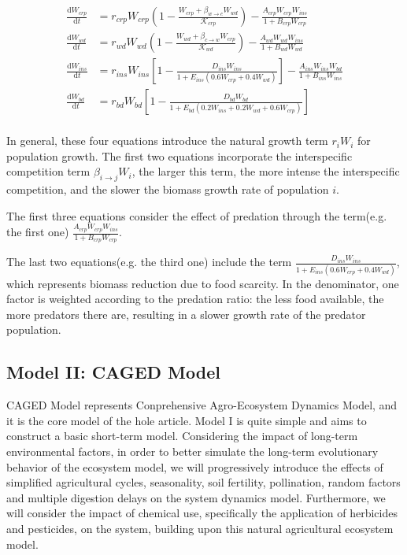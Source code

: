 \documentclass{HZNUMCM}
\begin{document}
      \begin{equation}
        \begin{aligned}
          \frac{\mathrm{d}W_{crp}}{\mathrm{d}t}&=r_{crp}W_{crp}\left( 1-\frac{W_{crp}+\beta _{w\rightarrow c}W_{wd}}{\mathscr{K} _{crp}} \right) -\frac{A_{crp}W_{crp}W_{ins}}{1+B_{crp}W_{crp}}\\
          \frac{\mathrm{d}W_{wd}}{\mathrm{d}t}&=r_{wd}W_{wd}\left( 1-\frac{W_{wd}+\beta _{c\rightarrow w}W_{crp}}{\mathscr{K} _{wd}} \right) -\frac{A_{wd}W_{wd}W_{ins}}{1+B_{wd}W_{wd}}\\
          \frac{\mathrm{d}W_{ins}}{\mathrm{d}t}&=r_{ins}W_{ins}\left[ 1-\frac{D_{ins}W_{ins}}{1+E_{ins}\left( 0.6W_{crp}+0.4W_{wd} \right)} \right] -\frac{A_{ins}W_{ins}W_{bd}}{1+B_{ins}W_{ins}}\\
          \frac{\mathrm{d}W_{bd}}{\mathrm{d}t} &= r_{bd}W_{bd} \left[ 1 - \frac{D_{bd}W_{bd}}{1 + E_{bd}(0.2W_{ins} + 0.2W_{wd} + 0.6W_{crp})} \right]\\
        \end{aligned} 
      \end{equation}

      In general, these four equations introduce the natural growth term $r_i W_i$ for population growth. 
      The first two equations incorporate the interspecific competition term $\beta_{i \rightarrow j} W_i$, 
      the larger this term, the more intense the interspecific competition, and the slower the biomass growth rate of population $i$. 
      
      The first three equations consider the effect of predation through the term(e.g. the first one) 
      $\frac{A_{crp} W_{crp} W_{ins}}{1 + B_{crp} W_{crp}}.$ 

      The last two equations(e.g. the third one) include the term 
        $\frac{D_{ins} W_{ins}}{1 + E_{ins} \left( 0.6 W_{crp} + 0.4 W_{wd} \right)}$,
      which represents biomass reduction due to food scarcity. 
      In the denominator, one factor is weighted according to the predation ratio: the less food available, 
      the more predators there are, resulting in a slower growth rate of the predator population.
    \subsection{Model II: CAGED Model}
      CAGED Model represents Conprehensive Agro-Ecosystem Dynamics Model, and it is the core model of the hole article.
      Model I is quite simple and aims to construct a basic short-term model. 
      Considering the impact of long-term environmental factors, 
      in order to better simulate the long-term evolutionary behavior of the ecosystem model, 
      we will progressively introduce the effects of simplified agricultural cycles, 
      seasonality, soil fertility, pollination, random factors and multiple digestion delays on the system dynamics model. 
      Furthermore, we will consider the impact of chemical use, 
      specifically the application of herbicides and pesticides, on the system, 
      building upon this natural agricultural ecosystem model.
\end{document}
